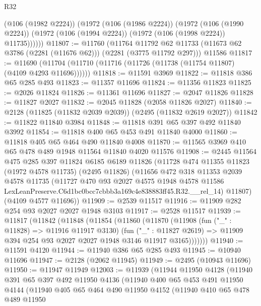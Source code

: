 \begin{lexlean}{R32}
\begin{coremodule}
        (@106 (@1982 @2224))
        (@1972
          (@106 (@1986 @2224))
          (@1972
            (@106 (@1990 @2224))
            (@1972 (@106 (@1994 @2224)) (@1972 (@106 (@1998 @2224)) @11735))))))
@11807 := @11760
    (@11764 @11792 @62 @11733 (@11673 @62 @3786 (@2281 (@11676 @62))) (@2281 (@3775 @11792 @297)))
    @11586
@11817 := @11690 (@11704 (@11710 (@11716 (@11726 (@11738 (@11754 @11807) (@4109 @4293 @11696))))))
@11818 := @11591 @3969
@11822 := @11818 @386 @65 @285 @493
@11823 := @11357 @11696
@11824 := @11356 @11823
@11825 := @2026 @11824
@11826 := @11361 @11696
@11827 := @2047 @11826
@11828 := @11827 @2027
@11832 := @2045 @11828 (@2058 @11826 @2027)
@11840 := @2128 (@11825 (@11832 @2039 @2039)) (@2495 (@11832 @2619 @2027))
@11842 := @11822 @11840 @3984
@11848 := @11818 @391 @65 @397 @492 @11840 @3992
@11854 := @11818 @400 @65 @453 @491 @11840 @4000
@11860 := @11818 @405 @65 @464 @490 @11840 @4008
@11870 := @11565 @3969 @410 @65 @478 @489 @1948 @11564 @11840 @4020 @11576
@11908 := @2445
    @11564
    @475
    @285
    @397
    @11824
    @6185
    @6189
    @11826
    (@11728
      @474
      @11355
      @11823
      (@1972 @4578 @11735)
      (@2495 @11826)
      (@11656
        @472
        @318
        @11353
        @2039
        @4578
        @11735
        (@11727
          @470
          @93
          @2027
          @4575
          @1948
          @4578
          @11586
          LexLeanPreserve.C6d1bc0bcc7cbbb3a169c4e838883ff45.R32.__rel_14)
        @11807)
      (@4109 @4577 @11696))
@11909 := @2539 @11517
@11916 := @11909 @282 @254 @93 @2027 @2027 @1948 @3103
@11917 := @2528 @11517
@11939 := @11817
    (@11842
      (@11848
        (@11854
          (@11860
            (@11870
              (@11908
                (fun ("_" : @11828) => @11916 @11917 @3130)
                (fun ("_" : @11827 @2619) =>
                @11909 @394 @254 @93 @2027 @2027 @1948 @3146 @11917 @3165)))))))
@11940 := @11591 @4120
@11944 := @11940 @386 @65 @285 @493
@11945 := @10940 @11696
@11947 := @2128 (@2062 @11945)
@11949 := @2495 (@10943 @11696)
@11950 := @11947 @11949
@12003 := @11939
    (@11944
      @11950
      @4128
      (@11940
        @391
        @65
        @397
        @492
        @11950
        @4136
        (@11940
          @400
          @65
          @453
          @491
          @11950
          @4144
          (@11940
            @405
            @65
            @464
            @490
            @11950
            @4152
            (@11940
              @410
              @65
              @478
              @489
              @11950

\end{coremodule}
\end{lexlean}
